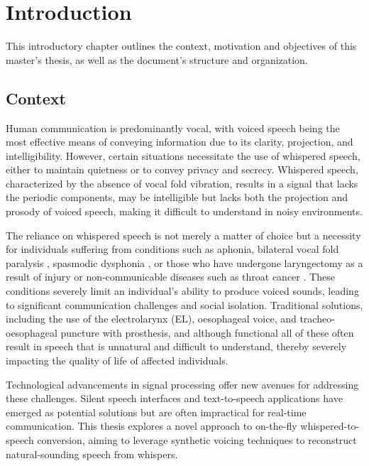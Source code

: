 \chapter{Introduction} \label{chap:intro}

This introductory chapter outlines the context, motivation and objectives of this master's thesis, as well as the document's structure and organization.

\section{Context}

Human communication is predominantly vocal, with voiced speech being the most effective means of conveying information due to its clarity, projection, and intelligibility. However, certain situations necessitate the use of whispered speech, either to maintain quietness or to convey privacy and secrecy. Whispered speech, characterized by the absence of vocal fold vibration, results in a signal that lacks the periodic components, may be intelligible but lacks both the projection and prosody of voiced speech, making it difficult to understand in noisy environments.

The reliance on whispered speech is not merely a matter of choice but a necessity for individuals suffering from conditions such as aphonia, bilateral vocal fold paralysis \cite{senatorovAphoniaInducedSimultaneous2013}, spasmodic dysphonia \cite{fabronMedicalTreatmentSpeech2013}, or those who have undergone laryngectomy as a result of injury or non-communicable diseases such as throat cancer \cite{jacobs1990carcinomas}. These conditions severely limit an individual's ability to produce voiced sounds, leading to significant communication challenges and social isolation. Traditional solutions, including the use of the electrolarynx (EL), oesophageal voice, and tracheo-oesophageal puncture with prosthesis, and although functional all of these often result in speech that is unnatural and difficult to understand, thereby severely impacting the quality of life of affected individuals.

Technological advancements in signal processing offer new avenues for addressing these challenges. Silent speech interfaces and text-to-speech \cite{oord2017parallelwavenetfasthighfidelity, ren2022fastspeech2fasthighquality} applications have emerged as potential solutions but are often impractical for real-time communication. This thesis explores a novel approach to on-the-fly whispered-to-speech conversion, aiming to leverage synthetic voicing techniques to reconstruct natural-sounding speech from whispers.


